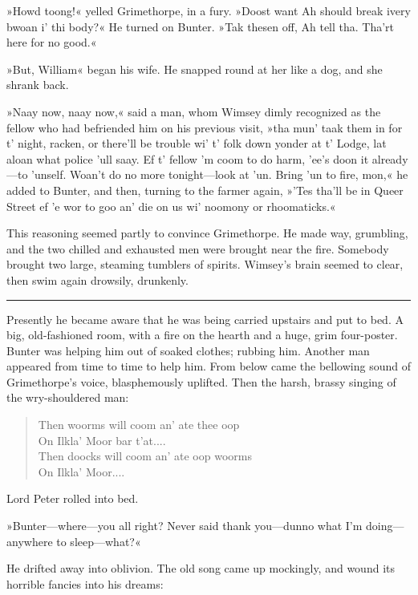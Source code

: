  »Howd toong!« yelled Grimethorpe, in a fury. »Doost want Ah should break ivery bwoan i' thi body?« He turned on Bunter. »Tak thesen off, Ah tell tha. Tha'rt here for no good.«

»But, William\longdash« began his wife. He snapped round at her like a dog, and she shrank back.

»Naay now, naay now,« said a man, whom Wimsey dimly recognized as the fellow who had befriended him on his previous visit, »tha mun' taak them in for t' night, racken, or there'll be trouble wi' t' folk down yonder at t' Lodge, lat aloan what police 'ull saay. Ef t' fellow 'm coom to do harm, 'ee's doon it already—to 'unself. Woan't do no more tonight—look at 'un. Bring 'un to fire, mon,« he added to Bunter, and then, turning to the farmer again, »'Tes tha'll be in Queer Street ef 'e wor to goo an' die on us wi' noomony or rhoomaticks.«

This reasoning seemed partly to convince Grimethorpe. He made way, grumbling, and the two chilled and exhausted men were brought near the fire. Somebody brought two large, steaming tumblers of spirits.  Wimsey's brain seemed to clear, then swim again drowsily, drunkenly. 

\noindent\hfil\rule{0.5\textwidth}{.4pt}\hfil 

Presently he became aware that he was being carried upstairs and put to bed. A big, old-fashioned room, with a fire on the hearth and a huge, grim four-poster. Bunter was helping him out of soaked clothes; rubbing him. Another man appeared from time to time to help him. From below came the bellowing sound of Grimethorpe's voice, blasphemously uplifted. Then the harsh, brassy singing of the wry-shouldered man: 

\begin{verse}
\begin{altverse}
Then woorms will coom an' ate thee oop\\
On Ilkla' Moor bar t'at....\\
Then doocks will coom an' ate oop woorms\\
On Ilkla' Moor....\\
\end{altverse}
\end{verse}


 Lord Peter rolled into bed.

»Bunter—where—you all right? Never said thank you—dunno what I'm doing—anywhere to sleep—what?«

He drifted away into oblivion. The old song came up mockingly, and wound its horrible fancies into his dreams: 

